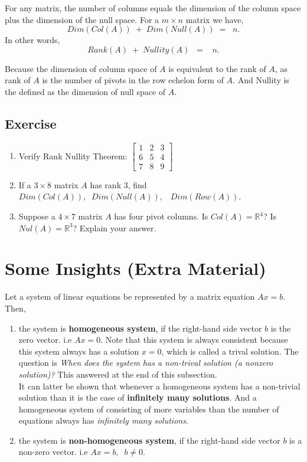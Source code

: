 \documentclass[aima104_lecturenotes_ku.tex]{subfiles}
\begin{document}
\begin{mdframed}
\begin{theorem}
For any matrix, the number of columns equals the dimension of the column space plus the dimension of the null space. For a $m \times n$ matrix we have, $$ Dim(Col(A))\; + \; Dim(Null(A)) \; = \;\;n. $$
In other words,
$$Rank(A) \; +\; Nullity(A)\;\; = \;\;\; n.$$
\end{theorem}
\end{mdframed}
Because the dimension of column space of \(A\) is equivalent to the rank of \(A\), as rank of \(A\) is the number of pivots in the row echelon form of \(A\). And Nullity is the defined as the dimension of null space of \(A\).

\subsection{Exercise}
\begin{enumerate}

\item Verify Rank Nullity Theorem:
$\displaystyle \begin{bmatrix}
    1 & 2 & 3 \\
    6 & 5 &4 \\
    7 & 8 & 9
\end{bmatrix}$

\item If a $3 \times 8$ matrix $A$ has rank $3$, find $ Dim(Col(A)),\;\; Dim(Null(A)), \;\;\; Dim(Row(A))$.

\item Suppose a $4 \times 7$ matrix $A$ has four pivot columns. Is $Col(A) = \mathbb{R}^4$? Is $Nul(A) = \mathbb{R}^3$? Explain your answer.

\end{enumerate}

\section{Some Insights (Extra Material)}
Let a system of linear equations be represented by a matrix equation \(Ax=b\). Then,
\begin{enumerate}
\item the system is \textbf{homogeneous system}, if the right-hand side vector \(b\) is the zero vector. i.e \(Ax=0\). Note that this system is always consistent because this system always has a solution \(x=0\), which is called a trival solution. The question is \textit{When does the system has a non-trival solution (a nonzero solution)?} This answered at the end of this subsection. \\
  It can latter be shown that whenever a homogeneous system has a non-trivial solution than it is the case of \textbf{infinitely many solutions}. And a homogeneous system of consisting of more variables than the number of equations always has \textit{infinitely many solutions}.

 \item the system is \textbf{non-homogeneous system}, if the right-hand side vector \(b\) is a non-zero vector. i.e \(Ax=b, \;\; b \neq 0\).
 \end{enumerate}
\end{document}
